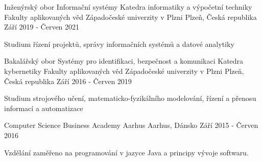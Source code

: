 

\begin{cventries}

    \cventry
    {Inženýrský obor Informační systémy} %
    {Katedra informatiky a výpočetní techniky Fakulty aplikovaných věd Západočeské univerzity v Plzni} %
    {Plzeň, Česká republika} %
    {Září 2019 - Červen 2021} %
    {
      \begin{cvitems} %
        \item {Studium řízení projektů, správy informačních systémů a datové analytiky}
      \end{cvitems}
    }

    \cventry
    {Bakalářský obor Systémy pro identifikaci, bezpečnost a komunikaci} %
    {Katedra kybernetiky Fakulty aplikovaných věd Západočeské univerzity v Plzni} %
    {Plzeň, Česká republika} %
    {Září 2016 - Červen 2019} %
    {
      \begin{cvitems} %
        \item {Studium strojového učení, matematicko-fyzikálního modelování, řízení a přenosu informací a automatizace}
      \end{cvitems}
    }

    \cventry
    {Computer Science}
    {Business Academy Aarhus}
    {Aarhus, Dánsko}
    {Září 2015 - Červen 2016}
    {
      \begin{cvitems}
        \item {Vzdělání zaměřeno na programování v jazyce Java a principy vývoje softwaru.}
      \end{cvitems}
    }


\end{cventries}
